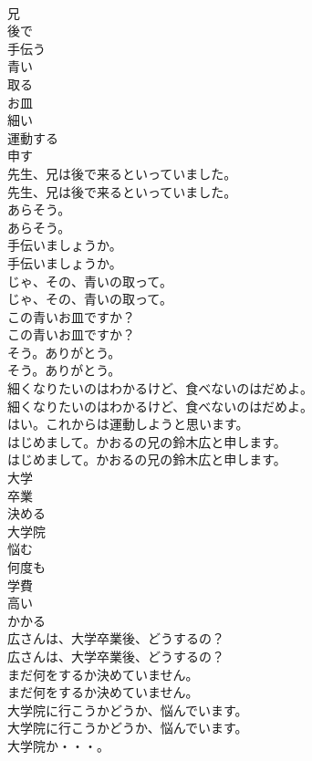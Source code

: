\documentclass[8pt]{extreport}
\begin{document}
\begin{CJK}{UTF8}{min}
\\	兄
\\	後で
\\	手伝う
\\	青い
\\	取る
\\	お皿
\\	細い
\\	運動する
\\	申す
\\	先生、兄は後で来るといっていました。	
\\	先生、兄は後で来るといっていました。 
\\	あらそう。	
\\	あらそう。 
\\	手伝いましょうか。	
\\	手伝いましょうか。 
\\	じゃ、その、青いの取って。	
\\	じゃ、その、青いの取って。 
\\	この青いお皿ですか？	
\\	この青いお皿ですか？ 
\\	そう。ありがとう。	
\\	そう。ありがとう。 
\\	細くなりたいのはわかるけど、食べないのはだめよ。	
\\	細くなりたいのはわかるけど、食べないのはだめよ。 
\\	はい。これからは運動しようと思います。 
\\	はじめまして。かおるの兄の鈴木広と申します。	
\\	はじめまして。かおるの兄の鈴木広と申します。 
\\	大学
\\	卒業
\\	決める
\\	大学院
\\	悩む
\\	何度も
\\	学費
\\	高い
\\	かかる
\\	広さんは、大学卒業後、どうするの？	
\\	広さんは、大学卒業後、どうするの？ 
\\	まだ何をするか決めていません。	
\\	まだ何をするか決めていません。 
\\	大学院に行こうかどうか、悩んでいます。	
\\	大学院に行こうかどうか、悩んでいます。 
\\	大学院か・・・。	

\end{CJK}
\end{document}
